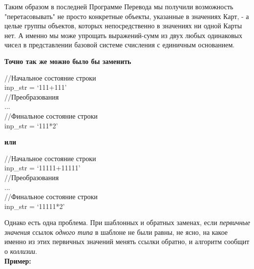 \documentclass{book}
\begin{document}
Таким образом в последней Программе Перевода мы получили возможность "перетасовывать" не просто конкретные объекты, указанные в значениях Карт, - а целые группы объектов, которых непосредственно в значениях ни одной Карты нет. А именно мы може упрощать выражений-сумм из двух любых одинаковых чисел в представлении базовой системе счисления с единичным основанием. 

\textbf{Точно так же можно было бы заменить} 

\begin{tcolorbox}[breakable]
//Начальное состояние строки \\
inp\_str = `111+111' \\

//Преобразования \\
... \\

//Финальное состояние строки \\
inp\_str = `111*2' \\
\end{tcolorbox}

\textbf{или}

\begin{tcolorbox}
//Начальное состояние строки \\
inp\_str = `11111+11111' \\

//Преобразования \\
... \\

//Финальное состояние строки \\
inp\_str = `11111*2'
\end{tcolorbox}

Однако есть одна проблема. При шаблонных и обратных заменах, если \textit{первичные значения} ссылок \textit{одного типа} в шаблоне не были равны, не ясно, на какое именно из этих первичных значений менять ссылки обратно, и алгоритм сообщит о \textit{коллизии}.\\

\textbf{Пример:}
\end{document}
